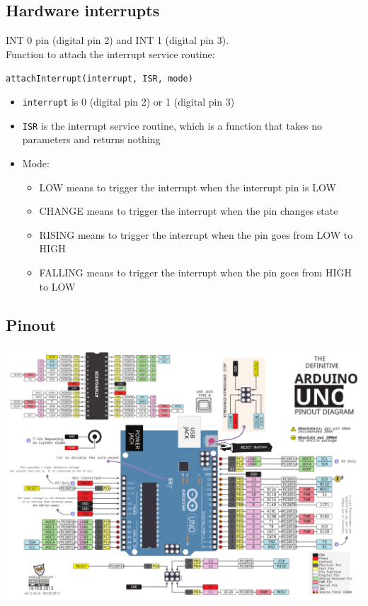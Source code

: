 \documentclass[11pt]{article}
\begin{document}
 \newpage

\subsection{Hardware interrupts}
\label{sec:org54dffc7}
INT 0 pin (digital pin 2) and INT 1 (digital pin 3).
\\[0pt]

Function to attach the interrupt service routine:

\texttt{attachInterrupt(interrupt, ISR, mode)}
\begin{itemize}
\item \texttt{interrupt} is 0 (digital pin 2) or 1 (digital pin 3)
\item \texttt{ISR} is the interrupt service routine, which is a function that takes no parameters and returns nothing
\item Mode:
\begin{itemize}
\item LOW means to trigger the interrupt when the interrupt pin is LOW
\item CHANGE means to trigger the interrupt when the pin changes state
\item RISING means to trigger the interrupt when the pin goes from LOW to HIGH
\item FALLING means to trigger the interrupt when the pin goes from HIGH to LOW
\end{itemize}
\end{itemize}

\subsection{Pinout}
\label{sec:orgea67b47}
\begin{center}
\includegraphics[width=.9\linewidth]{./images/arduino-uno-pinout.png}
\end{center}
\end{document}
